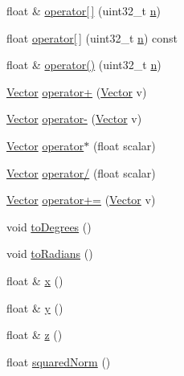 \begin{DoxyCompactItemize}
float \& \hyperlink{classetk_1_1_vector_a683b1cdef47aa3b7c49c9ea03ac9d4e2}{operator\mbox{[}$\,$\mbox{]}} (uint32\-\_\-t \hyperlink{classetk_1_1_vector_adc7028cab173d941591af508a7611325}{n})
\item 
float \hyperlink{classetk_1_1_vector_af2cc0f853874e3abd3fe8ef9881a9d26}{operator\mbox{[}$\,$\mbox{]}} (uint32\-\_\-t \hyperlink{classetk_1_1_vector_adc7028cab173d941591af508a7611325}{n}) const 
\item 
float \& \hyperlink{classetk_1_1_vector_afbb5e4e8fc9a74d512bfc72395dc7782}{operator()} (uint32\-\_\-t \hyperlink{classetk_1_1_vector_adc7028cab173d941591af508a7611325}{n})
\item 
\hyperlink{classetk_1_1_vector}{Vector} \hyperlink{classetk_1_1_vector_a37676cc9633a54eb66b57b930d989616}{operator+} (\hyperlink{classetk_1_1_vector}{Vector} v)
\item 
\hyperlink{classetk_1_1_vector}{Vector} \hyperlink{classetk_1_1_vector_a7ca59a3d3ca4e2ca21e180f9a13e5d34}{operator-\/} (\hyperlink{classetk_1_1_vector}{Vector} v)
\item 
\hyperlink{classetk_1_1_vector}{Vector} \hyperlink{classetk_1_1_vector_ae180a03be2a66d2bd23c9ad1d49075c2}{operator$\ast$} (float scalar)
\item 
\hyperlink{classetk_1_1_vector}{Vector} \hyperlink{classetk_1_1_vector_a4a88b37e3592669c58c57fb002f9ec92}{operator/} (float scalar)
\item 
\hyperlink{classetk_1_1_vector}{Vector} \hyperlink{classetk_1_1_vector_a6fc0ba048c368beca0491cf1070c486f}{operator+=} (\hyperlink{classetk_1_1_vector}{Vector} v)
\item 
void \hyperlink{classetk_1_1_vector_a8393123737e8d605ed21dba56e091fd0}{to\-Degrees} ()
\item 
void \hyperlink{classetk_1_1_vector_aad015afc5c7487af13febd726866f1b5}{to\-Radians} ()
\item 
float \& \hyperlink{classetk_1_1_vector_ac80693c21c2bc6d9e96e8c9e72a27351}{x} ()
\item 
float \& \hyperlink{classetk_1_1_vector_ac93ae69d7ad392faddb90386857097f8}{y} ()
\item 
float \& \hyperlink{classetk_1_1_vector_a71d458d6fd4f21836d73d02fd242f610}{z} ()
\item 
float \hyperlink{classetk_1_1_vector_a4ba1162279fdf4b621a8ce62ee56e644}{squared\-Norm} ()
\end{DoxyCompactItemize}


